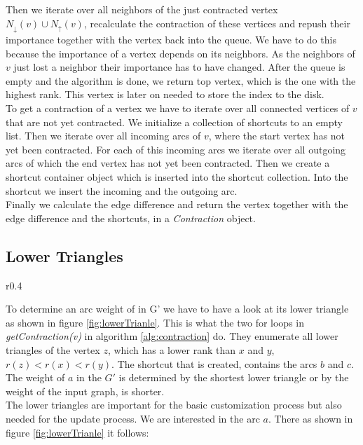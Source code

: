 Then we iterate over all neighbors of the just contracted vertex $N_\downarrow(v) \cup N_\uparrow(v)$, recalculate the contraction of these vertices and repush their importance together with the vertex back into the queue.
We have to do this because the importance of a vertex depends on its neighbors.
As the neighbors of $v$ just lost a neighbor their importance has to have changed.
After the queue is empty and the algorithm is done, we return top vertex, which is the one with the highest rank.
This vertex is later on needed to store the index to the disk.
\\
To get a contraction of a vertex we have to iterate over all connected vertices of $v$ that are not yet contracted.
We initialize  a collection of shortcuts to an empty list.
Then we iterate over all incoming arcs of $v$, where the start vertex has not yet been contracted.
For each of this incoming arcs we iterate over all outgoing arcs of which the end vertex has not yet been contracted.
Then we create a shortcut container object which is inserted into the shortcut collection.
Into the shortcut we insert the incoming and the outgoing arc.
\\
Finally we calculate the edge difference and return the vertex together with the edge difference and the shortcuts, in a \textit{Contraction} object.

\subsection{Lower Triangles} \label{sec:lower_triangles}

\begin{wrapfigure}{r}{0.4\textwidth}
    \centering
    
    \caption{Lower Triangle}
    \label{fig:lowerTrianle}
\end{wrapfigure}


To determine an arc weight of in G' we have to have a look at its lower triangle as shown in figure \ref{fig:lowerTrianle}.
This is what the two for loops in \textit{getContraction(v)} in algorithm \ref{alg:contraction} do.
They enumerate all lower triangles of the vertex $z$, which has a lower rank than $x$ and $y$, $r(z) < r(x) < r(y)$.
The shortcut that is created, contains the arcs $b$ and $c$.
The weight of $a$ in the $G'$ is determined by the shortest lower triangle or by the weight of the input graph, is shorter.
\\
The lower triangles are important for the basic customization process but also needed for the update process.
We are interested in the arc $a$.
There as shown in figure \ref{fig:lowerTrianle} it follows:


